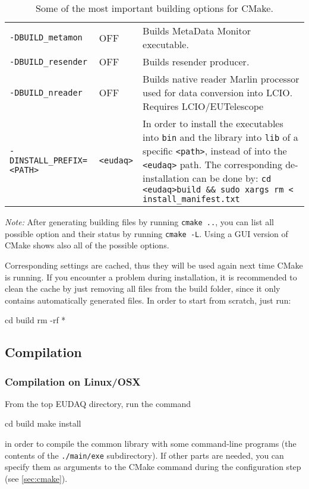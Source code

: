 \begin{table}[!h]
{\begin{tabular}{l|l|p{9.5cm}}
\texttt{-DBUILD\_metamon} &  OFF &  Builds MetaData Monitor executable. \\
\texttt{-DBUILD\_resender} & OFF &  Builds resender producer. \\
\texttt{-DBUILD\_nreader} &  OFF &  Builds native reader Marlin processor used for data conversion into LCIO. Requires LCIO/EUTelescope \\
\texttt{-DINSTALL\_PREFIX=<PATH>} & \texttt{<eudaq>} & In order to install the executables into \texttt{bin} and the library into \texttt{lib} of a specific \texttt{<path>}, instead of into the \texttt{<eudaq>} path. 
The corresponding de-installation can be done by:
\texttt{cd <eudaq>\/build\/ \&\& sudo xargs rm < install\_manifest.txt}
\end{tabular}
\caption{Some of the most important building options for CMake.}
\label{tab:cmakeoptions}
}
\end{table}

\textit{Note:} After generating building files by running \texttt{cmake ..}, you can list all possible option and their status by running \texttt{cmake -L}. 
Using a GUI version of CMake shows also all of the possible options.   

Corresponding settings are cached, thus they will be used again next time CMake is running.
If you encounter a problem during installation, it is recommended to clean the cache by just removing all files from the build folder, since it only contains automatically generated files. 
In order to start from scratch, just run:
\begin{listing}[mybash]
cd build
rm -rf *
\end{listing}


\subsection{Compilation}

\subsubsection{Compilation on Linux/OSX}
From the top EUDAQ directory, run the command
\begin{listing}[mybash]
cd build
make install
\end{listing}
in order to compile the common library with some command-line programs (the contents of the \texttt{./main/exe} subdirectory).
If other parts are needed, you can specify them as arguments to the
CMake command during the configuration step (see \ref{sec:cmake}).

